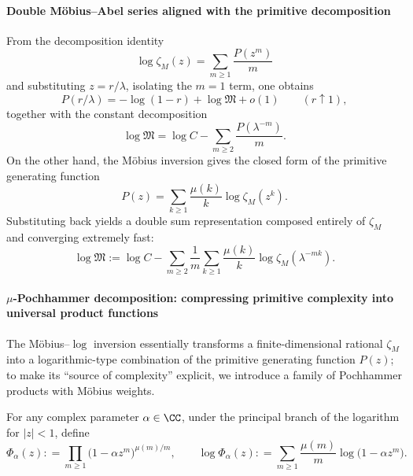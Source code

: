\paragraph{Double M\"obius--Abel series aligned with the primitive decomposition}
From the decomposition identity
\[
\log\zeta_M(z)=\sum_{m\ge 1}\frac{P(z^m)}{m}
\]
and substituting $z=r/\lambda$, isolating the $m=1$ term, one obtains
\[
P(r/\lambda)=-\log(1-r)+\log\mathfrak{M}+o(1)\qquad(r\uparrow 1),
\]
together with the constant decomposition
\[
\log\mathfrak{M}=\log C-\sum_{m\ge 2}\frac{P(\lambda^{-m})}{m}.
\]
On the other hand, the M\"obius inversion gives the closed form of the primitive generating function
\[
P(z)=\sum_{k\ge 1}\frac{\mu(k)}{k}\log\zeta_M(z^k).
\]
Substituting back yields a double sum representation composed entirely of $\zeta_M$ and converging extremely fast:
\[
\log\mathfrak{M}
:=\log C-\sum_{m\ge 2}\frac{1}{m}\sum_{k\ge 1}\frac{\mu(k)}{k}\log\zeta_M(\lambda^{-mk}).
\]

\paragraph{\texorpdfstring{$\mu$}{mu}-Pochhammer decomposition: compressing primitive complexity into universal product functions}
The M\"obius--$\log$ inversion essentially transforms a finite-dimensional rational \(\zeta_M\) into a logarithmic-type combination of the primitive generating function \(P(z)\); to make its ``source of complexity'' explicit, we introduce a family of Pochhammer products with M\"obius weights.

\begin{definition}\label{def:mu-pochhammer}
For any complex parameter \(\alpha\in\CC\), under the principal branch of the logarithm for \(|z|<1\), define
\[
\Phi_\alpha(z)
:\!=\prod_{m\ge 1}\bigl(1-\alpha z^m\bigr)^{\mu(m)/m},
\qquad
\log\Phi_\alpha(z)
:\!=\sum_{m\ge 1}\frac{\mu(m)}{m}\log\bigl(1-\alpha z^m\bigr).
\]
\end{definition}

